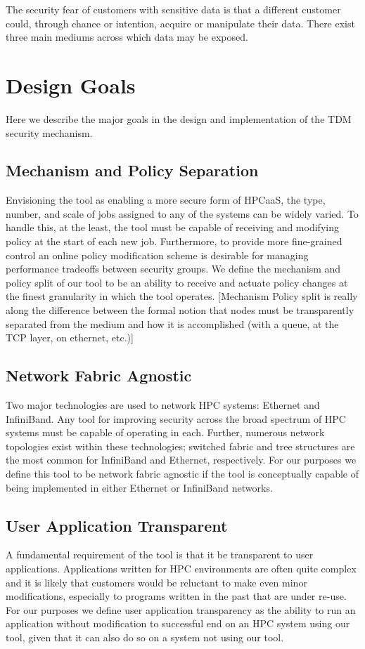 \documentclass{llncs}
\begin{document}
The security fear of customers with sensitive data is that a different customer could, through chance or intention, acquire or manipulate their data. There exist three main mediums across which data may be exposed. 
\section{Design Goals}
Here we describe the major goals in the design and implementation of the TDM security mechanism.
\subsection{Mechanism and Policy Separation}
Envisioning the tool as enabling a more secure form of HPCaaS, the type, number, and scale of jobs assigned to any of the systems can be widely varied. To handle this, at the least, the tool must be capable of receiving and modifying policy at the start of each new job. Furthermore, to provide more fine-grained control an online policy modification scheme is desirable for managing performance tradeoffs between security groups. We define the mechanism and policy split of our tool to be an ability to receive and actuate policy changes at the finest granularity in which the tool operates. [Mechanism Policy split is really along the difference between the formal notion that nodes must be transparently separated from the medium and how it is accomplished (with a queue, at the TCP layer, on ethernet, etc.)]
\subsection{Network Fabric Agnostic}
Two major technologies are used to network HPC systems: Ethernet and InfiniBand. Any tool for improving security across the broad spectrum of HPC systems must be capable of operating in each. Further, numerous network topologies exist within these technologies; switched fabric and tree structures are the most common for InfiniBand and Ethernet, respectively. For our purposes we define this tool to be network fabric agnostic if the tool is conceptually capable of being implemented in either Ethernet or InfiniBand networks. 
\subsection{User Application Transparent}
A fundamental requirement of the tool is that it be transparent to user applications. Applications written for HPC environments are often quite complex and it is likely that customers would be reluctant to make even minor modifications, especially to programs written in the past that are under re-use. For our purposes we define user application transparency as the ability to run an application without modification to successful end on an HPC system using our tool, given that it can also do so on a system not using our tool. 
\end{document}
